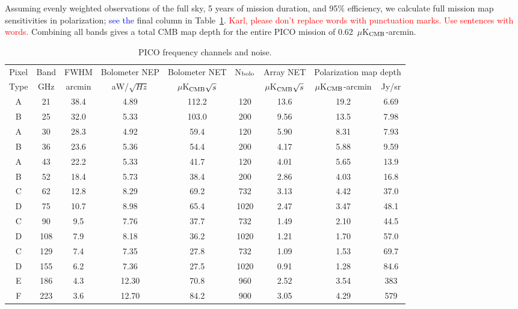 \documentclass[]{spie}  %
\newcommand{\comr}[1]{\textcolor{red}{#1}}
\newcommand{\comb}[1]{\textcolor{blue}{#1}}
\begin{document}
Assuming evenly weighted observations 
of the full sky, 5 years of mission duration, and 95\% efficiency, we calculate full mission map sensitivities in polarization; \comb{see the } 
final column in Table~\ref{tab:noise}. \comr{Karl, please don't replace words with punctuation marks. Use sentences with words.} 
Combining all bands gives a total CMB map depth for the entire PICO mission of 0.62~$\mu$K$_{\rm CMB}$-arcmin.

\begin{table}[ht]
\centering
\caption{PICO frequency channels and noise. }
\label{tab:noise}
\begin{tabular}{|c|c|c|c|c|c|c|cc|}
\hline
Pixel  & Band  & FWHM   & Bolometer NEP & Bolometer NET        & N$_{\rm bolo}$ & Array NET            & \multicolumn{2}{|c|}{Polarization map depth}  \\
Type   & GHz   & arcmin & aW/$\sqrt{Hz}$ & $\mu$K$_{\rm CMB}\sqrt{s}$ &           & $\mu$K$_{\rm CMB}\sqrt{s}$ & $\mu$K$_{\rm CMB}$-arcmin & Jy/sr     \\ \hline
A     & 21  & 38.4 & 4.89  & 112.2   & 120   & 13.6  & 19.2  & 6.69 \\
B     & 25  & 32.0 & 5.33  & 103.0   & 200   & 9.56   & 13.5 & 7.98  \\
A     & 30  & 28.3 & 4.92  & 59.4    & 120   & 5.90   & 8.31 & 7.93   \\
B     & 36  & 23.6 & 5.36  & 54.4    & 200   & 4.17   & 5.88 & 9.59   \\
A     & 43  & 22.2 & 5.33  & 41.7    & 120   & 4.01   & 5.65 & 13.9   \\
B     & 52  & 18.4 & 5.73  & 38.4    & 200   & 2.86   & 4.03 & 16.8   \\
C     & 62  & 12.8 & 8.29  & 69.2    & 732   & 3.13   & 4.42 & 37.0   \\
D     & 75  & 10.7 & 8.98  & 65.4    & 1020  & 2.47   & 3.47 & 48.1   \\
C     & 90  & 9.5  & 7.76  & 37.7    & 732   & 1.49   & 2.10 & 44.5   \\
D     & 108 & 7.9  & 8.18  & 36.2    & 1020  & 1.21   & 1.70 & 57.0   \\
C     & 129 & 7.4  & 7.35  & 27.8    & 732   & 1.09   & 1.53 & 69.7   \\
D     & 155 & 6.2  & 7.36  & 27.5    & 1020  & 0.91   & 1.28 & 84.6   \\
E     & 186 & 4.3  & 12.30 & 70.8    & 960   & 2.52   & 3.54 & 383    \\
F     & 223 & 3.6  & 12.70 & 84.2    & 900   & 3.05   & 4.29 & 579    \\

\end{tabular}
\end{table}
\end{document}
